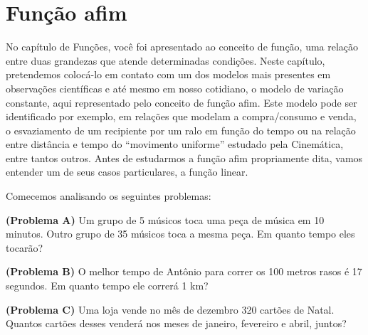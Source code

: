 \renewcommand\chapterillustration{abertura-estatistica1}
\renewcommand\chapterwhat{Funções linear e afim e suas representações algébrica e gráfica, taxa de variação, proporcionalidade direta, funções afins de domínio discreto (Progressões Aritméticas), Aplicações.}
\renewcommand\chapterbecause{O modelo de variação constante é um dos modelos mais presentes em observações científicas e até mesmo em nosso cotidiano. Ele pode ser identificado por exemplo, em relações que modelam a compra/consumo e venda, o esvaziamento de um recipiente por um ralo em função do tempo ou na relação entre distância e tempo do “movimento uniforme” estudado pela Cinemática, entre tantos outros. Um caso particularmente importante é aquele em que há proporcionalidade entre as grandezas envolvidas na modelagem. As ideias desenvolvidas nesse capítulo servem como base para aplicações em diversas áreas.}
\chapter{Função afim}


\label{\detokenize{AF107-0::doc}}\label{\detokenize{AF107-0:explorando-funcao-linear}}
No capítulo de Funções, você foi apresentado ao conceito de função, uma relação entre duas grandezas que atende determinadas condições. Neste capítulo, pretendemos colocá-lo em contato com um dos modelos mais presentes em observações científicas e até mesmo em nosso cotidiano, o modelo de variação constante, aqui representado pelo conceito de função afim. Este modelo pode ser identificado por exemplo, em relações que modelam a compra/consumo e venda, o esvaziamento de um recipiente por um ralo em função do tempo ou na relação entre distância e tempo do “movimento uniforme” estudado pela Cinemática, entre tantos outros. Antes de estudarmos a função afim propriamente dita, vamos entender um de seus casos particulares, a função linear.

Comecemos analisando os seguintes problemas:

\textbf{(Problema A)} Um grupo de 5 músicos toca uma peça de música em 10 minutos. Outro grupo de 35 músicos toca a mesma peça. Em quanto tempo eles tocarão?

\textbf{(Problema B)} O melhor tempo de Antônio para correr os 100 metros rasos é 17 segundos. Em quanto tempo ele correrá 1 km?

\textbf{(Problema C)} Uma loja vende no mês de dezembro 320 cartões de Natal. Quantos cartões desses venderá nos meses de janeiro, fevereiro e abril, juntos?

